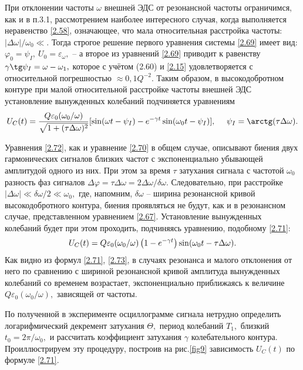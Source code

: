 {При отклонении частоты $\omega$ внешней ЭДС от резонансной частоты   ограничимся, как и в п.3.1, рассмотрением наиболее интересного случая, когда выполняется неравенство \eqref{2.58}, означающее, что мала относительная расстройка частоты: $|\Delta\omega|/\omega_0\ll.$ Тогда строгое решение первого уравнения системы \eqref{2.69} имеет вид: $\varphi_0=\psi_I,~U_0=\varepsilon_{\omega},$ – а второе из уравнений \eqref{2.69} приводит к равенству $\gamma\tg\psi_I=\omega-\omega_1,$ которое с учётом (2.60) и \eqref{2.15} удовлетворяется с относительной погрешностью $\approx0,1Q^{-2}.$ Таким образом, в высокодобротном контуре при малой относительной расстройке частоты внешней ЭДС установление вынужденных колебаний подчиняется уравнениям
\begin{equation}\eqmark{2.72}
	U_C(t)=\dfrac{Q\varepsilon_0(\omega_0/\omega)}{\sqrt{1+(\tau\Delta\omega)^2}}[\sin(\omega t-\psi_I)-e^{-\gamma t}\sin(\omega_0t-\psi_I)],~~~~\psi_I=\arctg(\tau\Delta\omega).
\end{equation}

Уравнения \eqref{2.72}, как и уравнение \eqref{2.70} в общем случае, описывают биения двух гармонических сигналов близких частот с экспоненциально убывающей амплитудой одного из них. При этом за время $\tau$ затухания сигнала с частотой $\omega_0$ разность фаз сигналов $\Delta\varphi=\tau\Delta\omega=2\Delta\omega/\delta\omega.$ Следовательно, при расстройке $|\Delta\omega|\ll\delta\omega/2\ll\omega_0,$ где, напомним, $\delta\omega$ – ширина резонансной кривой высокодобротного контура, биения проявляться не будут, как и в резонансном случае, представленном уравнением \eqref{2.67}. Установление вынужденных колебаний будет при этом проходить, подчиняясь уравнению, подобному \eqref{2.71}:
\begin{equation}\eqmark{2.73}
	U_C(t)=Q\varepsilon_0(\omega_0/\omega)\left(1-e^{-\gamma t}\right)\sin(\omega_0t-\tau\Delta\omega).
\end{equation}
Как видно из формул \eqref{2.71}, \eqref{2.73}, в случаях резонанса и малого отклонения от него по сравнению с шириной резонансной кривой амплитуда вынужденных колебаний со временем возрастает, экспоненциально приближаясь к величине $Q\varepsilon_0(\omega_0/\omega),$ зависящей от частоты. 

По полученной в эксперименте осциллограмме сигнала нетрудно определить логарифмический декремент затухания $\Theta,$ период колебаний $T_1,$ близкий $t_0=2\pi/\omega_0,$ и рассчитать коэффициент затухания $\gamma$ колебательного контура. Проиллюстрируем эту процедуру, построив на рис.\ref{fig9} зависимость $U_C(t)$ по формуле \eqref{2.71}.

}
